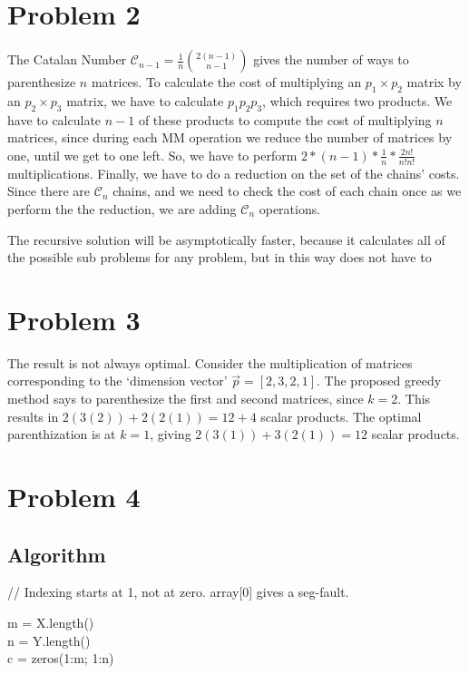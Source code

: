 \documentclass[10pt]{article}
\begin{document}
\section*{Problem 2}
The Catalan Number $\mathcal{C}_{n-1} = \frac1{n}\binom{2(n-1)}{n-1}$ gives the number of ways to parenthesize $n$ matrices. To calculate the cost of multiplying an $p_1\times p_2$ matrix by an $p_2 \times p_3$ matrix, we have to calculate $p_1p_2p_3$, which requires two products. We have to calculate $n-1$ of these products to compute the cost of multiplying $n$ matrices, since during each MM operation we reduce the number of matrices by one, until we get to one left. So, we have to perform $2*(n-1)*\frac1n*\frac{2n!}{n!n!}$ multiplications. Finally, we have to do a reduction on the set of the chains' costs. Since there are $\mathcal{C}_n$ chains, and we need to check the cost of each chain once as we perform the the reduction, we are adding $\mathcal{C}_n$ operations.

The recursive solution will be asymptotically faster, because it calculates all of the possible sub problems for any problem, but in this way does not have to 

\section*{Problem 3}
The result is not always optimal. Consider the multiplication of matrices corresponding to the `dimension vector'
$\vec{p} = [2, 3, 2, 1]$. The proposed greedy method says to parenthesize the first and second matrices, since $k=2$. This results in $2(3(2)) + 2(2(1)) = 12 + 4$ scalar products. The optimal parenthization is at $k=1$, giving $2(3(1))+3(2(1)) = 12$ scalar products.
\section*{Problem 4}
\subsection*{Algorithm}
// Indexing starts at 1, not at zero. array[0] gives a seg-fault.

m = X.length()\\
n = Y.length()\\
c = zeros(1:m; 1:n)\\
\end{document}
